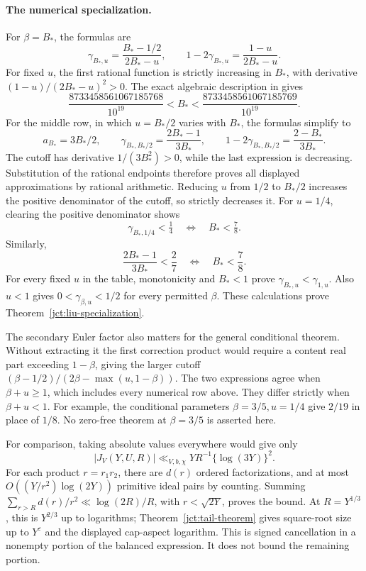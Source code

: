 \paragraph{The numerical specialization.}
For \(\beta=B_*\), the formulas are
\[
 \gamma_{B_*,u}=\frac{B_*-1/2}{2B_*-u},\qquad
 1-2\gamma_{B_*,u}=\frac{1-u}{2B_*-u}.
\]
For fixed \(u\), the first rational function is strictly increasing in \(B_*\),
with derivative \((1-u)/(2B_*-u)^2>0\).
The exact algebraic description in \cite[equations~(42), (44)]{JCTLiu}
gives
\[
 \frac{8733458561067185768}{10^{19}}<B_*<
 \frac{8733458561067185769}{10^{19}}.
\]
For the middle row, in which \(u=B_*/2\) varies with \(B_*\),
the formulas simplify to
\[
 a_{B_*}=3B_*/2,\qquad
 \gamma_{B_*,B_*/2}=\frac{2B_*-1}{3B_*},\qquad
 1-2\gamma_{B_*,B_*/2}=\frac{2-B_*}{3B_*}.
\]
The cutoff has derivative \(1/(3B_*^2)>0\), while the last
expression is decreasing. Substitution of the rational endpoints
therefore proves all displayed approximations by rational arithmetic.
Reducing \(u\) from \(1/2\) to \(B_*/2\) increases the positive
denominator of the cutoff, so strictly decreases it.
For \(u=1/4\), clearing
the positive denominator shows
\[
 \gamma_{B_*,1/4}<\tfrac14
 \quad\Longleftrightarrow\quad B_*<\tfrac78.
\]
Similarly,
\[
 \frac{2B_*-1}{3B_*}<\frac27
 \quad\Longleftrightarrow\quad B_*<\frac78.
\]
For every fixed \(u\) in the table, monotonicity and \(B_*<1\) prove
\(\gamma_{B_*,u}<\gamma_{1,u}\). Also \(u<1\) gives
\(0<\gamma_{\beta,u}<1/2\) for every permitted \(\beta\).
These calculations prove Theorem~\ref{jct:liu-specialization}.

The secondary Euler factor also matters for the general conditional
theorem. Without extracting it the first correction product would
require a content real part exceeding \(1-\beta\), giving the
larger cutoff
\((\beta-1/2)/(2\beta-\max(u,1-\beta))\).
The two expressions agree when \(\beta+u\ge1\), which includes
every numerical row above. They differ strictly when
\(\beta+u<1\). For example, the conditional parameters
\(\beta=3/5,u=1/4\) give \(2/19\) in place of \(1/8\).
No zero-free theorem at \(\beta=3/5\) is asserted here.

For comparison, taking absolute values everywhere would give
only
\begin{equation}
 |J_V(Y,U,R)|\ll_{V,b,\chi}
 YR^{-1}\{\log(3Y)\}^2.
 \label{jct:absolute-comparison}
\end{equation}
For each product \(r=r_1r_2\), there are \(d(r)\) ordered
factorizations, and at most
\(O((Y/r^2)\log(2Y))\) primitive ideal pairs by counting.
Summing \(\sum_{r>R}d(r)/r^2\ll\log(2R)/R\), with
\(r<\sqrt{2Y}\), proves the bound.
At \(R=Y^{1/3}\), this is \(Y^{2/3}\) up to logarithms;
Theorem~\ref{jct:tail-theorem} gives square-root size up to
\(Y^\varepsilon\) and the displayed cap-aspect logarithm.
This is signed cancellation in a nonempty portion of the
balanced expression.  It does not bound the remaining portion.

